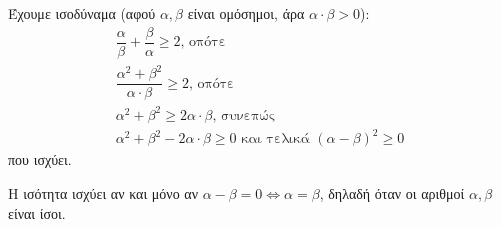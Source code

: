 
\begin{alist}
\item Έχουμε ισοδύναμα (αφού $\alpha, \beta$ είναι ομόσημοι, άρα $\alpha \cdot \beta > 0$):
\begin{gather*}
\dfrac{\alpha}{\beta} + \dfrac{\beta}{\alpha} \ge 2\text{, οπότε} \\
\dfrac{\alpha^2 + \beta^2}{\alpha \cdot \beta} \ge 2\text{, οπότε} \\
\alpha^2 + \beta^2 \ge 2\alpha \cdot \beta\text{, συνεπώς} \\
\alpha^2 + \beta^2 - 2\alpha \cdot \beta \ge 0\text{ και τελικά } (\alpha - \beta)^2 \ge 0
\end{gather*}
που ισχύει.
\item Η ισότητα ισχύει αν και μόνο αν $\alpha - \beta = 0 \Leftrightarrow \alpha = \beta$, δηλαδή όταν οι αριθμοί $\alpha, \beta$ είναι ίσοι.
\end{alist}

